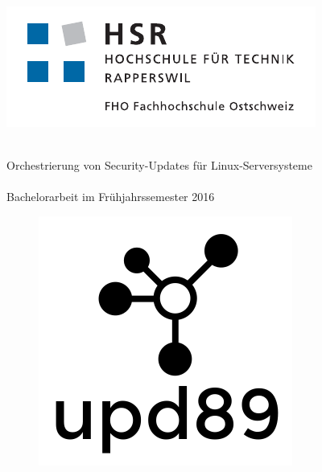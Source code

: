 
\author{
	\ubos \\
	\and
	\pchr \\
}

\clearpage
\begin{titlepage}
	\begin{minipage}{0.4\textwidth}
		\includegraphics[width=\textwidth]{fig/hsr-logo}
	\end{minipage}
	\hfill

	\begin{center}
		\hr{1pt} \\[0.2cm]
		\huge Orchestrierung von Security-Updates für Linux-Serversysteme \\
		\hr{1pt} \\[0.2cm]
		\Large{Bachelorarbeit im Frühjahrssemester 2016} \\ [25pt]
		\begin{figure}[H]
			\centering
			\includegraphics{fig/logo_upd89}
		\end{figure}
		\vfill
	\end{center}


\end{titlepage}
